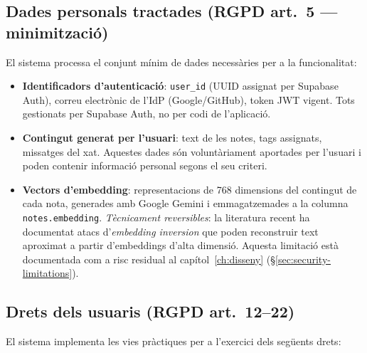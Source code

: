 \subsection{Dades personals tractades (RGPD art.~5 --- minimització)}

El sistema processa el conjunt mínim de dades necessàries per a la funcionalitat:

\begin{itemize}
    \item \textbf{Identificadors d'autenticació}: \texttt{user\_id} (UUID assignat per Supabase Auth), correu electrònic de l'IdP (Google/GitHub), token JWT vigent. Tots gestionats per Supabase Auth, no per codi de l'aplicació.
    \item \textbf{Contingut generat per l'usuari}: text de les notes, tags assignats, missatges del xat. Aquestes dades són voluntàriament aportades per l'usuari i poden contenir informació personal segons el seu criteri.
    \item \textbf{Vectors d'embedding}: representacions de 768 dimensions del contingut de cada nota, generades amb Google Gemini i emmagatzemades a la columna \texttt{notes.embedding}. \emph{Tècnicament reversibles}: la literatura recent ha documentat atacs d'\emph{embedding inversion} que poden reconstruir text aproximat a partir d'embeddings d'alta dimensió. Aquesta limitació està documentada com a risc residual al capítol~\ref{ch:disseny} (\S\ref{sec:security-limitations}).
\end{itemize}

\subsection{Drets dels usuaris (RGPD art.~12--22)}

El sistema implementa les vies pràctiques per a l'exercici dels següents drets:

